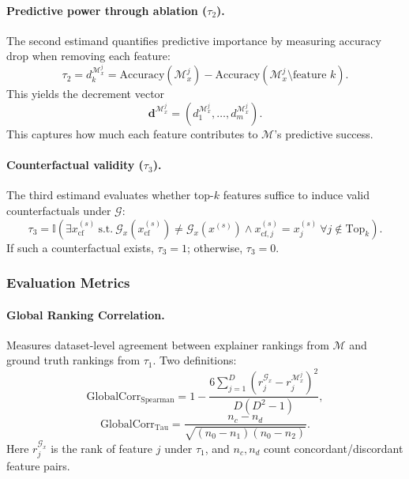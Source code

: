 \documentclass[mnsc,blindrev]{informs3}
\begin{document}
\paragraph{Predictive power through ablation ($\tau_2$).}
\label{app:intend_estimand_2}
The second estimand quantifies predictive importance by measuring accuracy drop when removing each feature:
\begin{equation}
    \tau_2 = d_k^{\mathcal{M}_x^j} = \text{Accuracy}(\mathcal{M}_x^j) - \text{Accuracy}(\mathcal{M}_x^j \setminus \text{feature } k).
\end{equation}
This yields the decrement vector
\begin{equation}
    \mathbf{d}^{\mathcal{M}_x^j} = (d_1^{\mathcal{M}_x^j}, \ldots, d_m^{\mathcal{M}_x^j}).
\end{equation}
This captures how much each feature contributes to $\mathcal{M}$’s predictive success.

\paragraph{Counterfactual validity ($\tau_3$).}
\label{app:intend_estimand_3}
The third estimand evaluates whether top-$k$ features suffice to induce valid counterfactuals under $\mathcal{G}$:
\begin{equation}
    \tau_3 = \mathbb{I}\left(\exists x_{\text{cf}}^{(s)} \ \text{s.t.}\ \mathcal{G}_x(x_{\text{cf}}^{(s)}) \neq \mathcal{G}_x(x^{(s)}) \land x_{\text{cf},j}^{(s)} = x_j^{(s)}\ \forall j \notin \text{Top}_k\right).
\end{equation}
If such a counterfactual exists, $\tau_3=1$; otherwise, $\tau_3=0$.

\subsubsection{Evaluation Metrics}
\label{app:metrics}
\paragraph{Global Ranking Correlation.}
Measures dataset-level agreement between explainer rankings from $\mathcal{M}$ and ground truth rankings from $\tau_1$. Two definitions:
\begin{equation}
\text{GlobalCorr}_{\text{Spearman}} = 1 - \frac{6\sum_{j=1}^D (r^{\mathcal{G}_x}_j - r^{\mathcal{M}_x^j}_j)^2}{D(D^2-1)} ,
\end{equation}
\begin{equation}
\text{GlobalCorr}_{\text{Tau}} = \frac{n_c - n_d}{\sqrt{(n_0 - n_1)(n_0 - n_2)}} .
\end{equation}
Here $r^{\mathcal{G}_x}_j$ is the rank of feature $j$ under $\tau_1$, and $n_c,n_d$ count concordant/discordant feature pairs.
\end{document}
